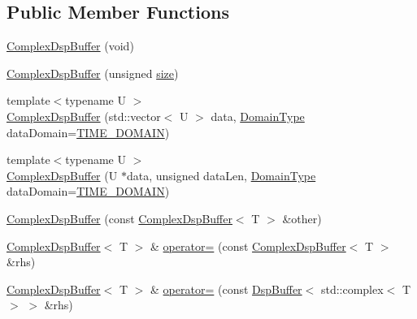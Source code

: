 \subsection*{Public Member Functions}
\begin{DoxyCompactItemize}
\item 
\hyperlink{class_smart_dsp_1_1_complex_dsp_buffer_abf8205d2b2da2719ec01f5a42928c02a}{Complex\+Dsp\+Buffer} (void)
\item 
\hyperlink{class_smart_dsp_1_1_complex_dsp_buffer_a6491f355dc36aff799b7518444be907e}{Complex\+Dsp\+Buffer} (unsigned \hyperlink{class_smart_dsp_1_1_dsp_buffer_af931c57c26c1f459cae47ca4b249d402}{size})
\item 
{\footnotesize template$<$typename U $>$ }\\\hyperlink{class_smart_dsp_1_1_complex_dsp_buffer_a7bb259898457e3cd449143264e3d948c}{Complex\+Dsp\+Buffer} (std\+::vector$<$ U $>$ data, \hyperlink{namespace_smart_dsp_a0aa2e95fc5daec3aee23af9976fcafa5}{Domain\+Type} data\+Domain=\hyperlink{namespace_smart_dsp_a0aa2e95fc5daec3aee23af9976fcafa5aeb7171be8bf3e58d9181dfb17a37b05f}{T\+I\+M\+E\+\_\+\+D\+O\+M\+A\+I\+N})
\item 
{\footnotesize template$<$typename U $>$ }\\\hyperlink{class_smart_dsp_1_1_complex_dsp_buffer_a0fe2d55b5d9b5f2871bd5dc3ed6efe93}{Complex\+Dsp\+Buffer} (U $\ast$data, unsigned data\+Len, \hyperlink{namespace_smart_dsp_a0aa2e95fc5daec3aee23af9976fcafa5}{Domain\+Type} data\+Domain=\hyperlink{namespace_smart_dsp_a0aa2e95fc5daec3aee23af9976fcafa5aeb7171be8bf3e58d9181dfb17a37b05f}{T\+I\+M\+E\+\_\+\+D\+O\+M\+A\+I\+N})
\item 
\hyperlink{class_smart_dsp_1_1_complex_dsp_buffer_a7f178a71d2e145a4adcd2e8ae43ffc95}{Complex\+Dsp\+Buffer} (const \hyperlink{class_smart_dsp_1_1_complex_dsp_buffer}{Complex\+Dsp\+Buffer}$<$ T $>$ \&other)
\item 
\hyperlink{class_smart_dsp_1_1_complex_dsp_buffer}{Complex\+Dsp\+Buffer}$<$ T $>$ \& \hyperlink{class_smart_dsp_1_1_complex_dsp_buffer_a0c760c221731beb2a9420e5f4a78459b}{operator=} (const \hyperlink{class_smart_dsp_1_1_complex_dsp_buffer}{Complex\+Dsp\+Buffer}$<$ T $>$ \&rhs)
\item 
\hyperlink{class_smart_dsp_1_1_complex_dsp_buffer}{Complex\+Dsp\+Buffer}$<$ T $>$ \& \hyperlink{class_smart_dsp_1_1_complex_dsp_buffer_a2f81014300646ede5b3375dae6336eaa}{operator=} (const \hyperlink{class_smart_dsp_1_1_dsp_buffer}{Dsp\+Buffer}$<$ std\+::complex$<$ T $>$ $>$ \&rhs)
\item 

\end{DoxyCompactItemize}
